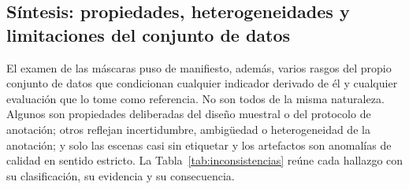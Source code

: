 \subsection{Síntesis: propiedades, heterogeneidades y limitaciones del conjunto de datos}
\label{sec:inconsistencias}

El examen de las máscaras puso de manifiesto, además, varios rasgos del propio conjunto de datos
que condicionan cualquier indicador derivado de él y cualquier evaluación que lo tome como
referencia. No son todos de la misma naturaleza. Algunos son propiedades deliberadas del diseño
muestral o del protocolo de anotación; otros reflejan incertidumbre, ambigüedad o heterogeneidad
de la anotación; y solo las escenas casi sin etiquetar y los artefactos son anomalías de calidad
en sentido estricto. La Tabla~\ref{tab:inconsistencias} reúne cada hallazgo con su
clasificación, su evidencia y su consecuencia.

